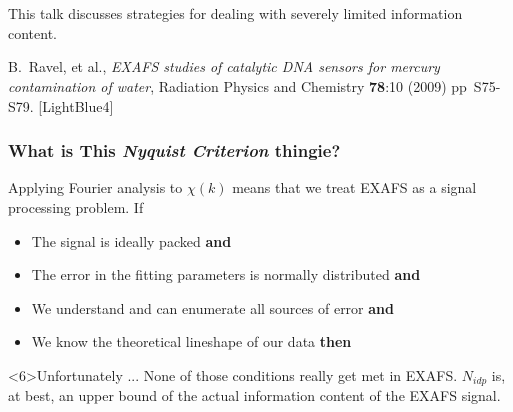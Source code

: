 \documentclass[10pt, xcolor=x11names, compress]{beamer}
\begin{document}
\begin{frame}
  ~\\[-7ex]
  ~

  \begin{exampleblock}{}
    \begin{center}
      This talk discusses strategies for dealing with severely limited
      information content.
    \end{center}
  \end{exampleblock}

  \begin{bottomnote}[0.7][19.0]%
    B.\ Ravel, et al., \textit{EXAFS studies of catalytic DNA sensors
      for mercury contamination of water}, Radiation Physics and
    Chemistry \textbf{78}:10 (2009) pp\ S75-S79.
    [LightBlue4]
  \end{bottomnote}
\end{frame}

\begin{frame}
  \frametitle{What is This \textit{Nyquist Criterion} thingie?}

  Applying Fourier analysis to $\chi(k)$ means that we treat EXAFS as
  a signal processing problem.  If
  \begin{itemize}
  \item<1-> The signal is ideally packed \alert{\textbf{and}}
  \item<2-> The error in the fitting parameters is normally distributed
    \alert{\textbf{and}}
  \item<3-> We understand and can enumerate all sources of error
    \alert{\textbf{and}}
  \item<4-> We know the theoretical lineshape of our data
    \alert{\textbf{then}}
  \end{itemize}

  \medskip


  \begin{alertblock}<6>{Unfortunately ...}
    None of those conditions really get met in EXAFS.  $N_{idp}$ is,
    at best, an upper bound of the actual information content of the
    EXAFS signal.
  \end{alertblock}
  
\end{frame}
\end{document}
